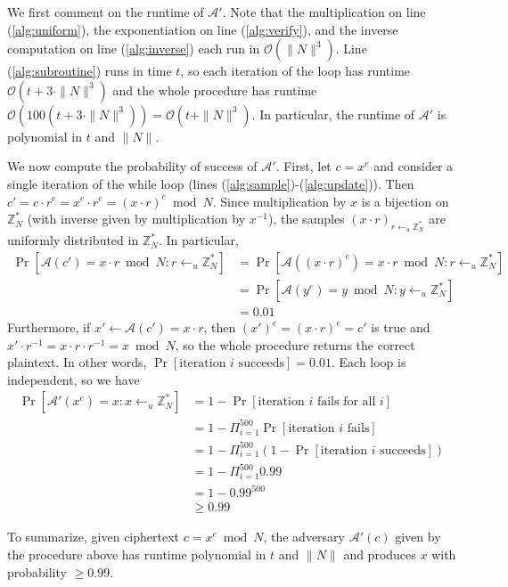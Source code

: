 \documentclass[12pt]{article}
\numberwithin{equation}{section}
\theoremstyle{plain}
\DeclareMathOperator*{\prob}{Pr}
\newcommand{\adv}{\mathcal{A}}
\newcommand{\advv}{\mathcal{A}'}
\begin{document}
We first comment on the runtime of $\advv$.
Note that the multiplication on line (\ref{alg:uniform}),
the exponentiation on line (\ref{alg:verify}),
and the inverse computation on line (\ref{alg:inverse})
each run in $\mathcal{O}(\|N\|^3)$.
Line (\ref{alg:subroutine}) runs in time $t$,
so each iteration of the loop has runtime $\mathcal{O}(t + 3 \cdot \|N\|^3)$
and the whole procedure has runtime $\mathcal{O}(100 (t + 3 \cdot \|N\|^3)) = \mathcal{O}(t + \|N\|^3)$.
In particular, the runtime of $\advv$ is polynomial in $t$ and $\| N \|$.

We now compute the probability of success of $\advv$.
First, let $c = x^e$ and consider a single iteration of the while loop (lines (\ref{alg:sample})-(\ref{alg:update})).
Then $c' = c \cdot r^e = x^e \cdot r^e = (x \cdot r)^e \bmod N$.
Since multiplication by $x$ is a bijection on $\mathbb{Z}^*_N$ (with inverse given by multiplication by $x^{-1}$),
the samples $(x \cdot r)_{r \gets_u \mathbb{Z}^*_N}$ are uniformly distributed in $\mathbb{Z}^*_N$.
In particular,
\begin{align*}
    \prob[\adv(c') = x \cdot r \bmod N : r \gets_u \mathbb{Z}^*_N]
        &= \prob[\adv((x \cdot r)^e) = x \cdot r \bmod N : r \gets_u \mathbb{Z}^*_N]\\
        &= \prob[\adv(y^e) = y \bmod N : y \gets_u \mathbb{Z}^*_N]\\
        &= 0.01
\end{align*}
Furthermore, if $x' \gets \adv(c') = x \cdot r$, then $(x')^e = (x \cdot r)^e = c'$ is true
and $x' \cdot r^{-1} = x \cdot r \cdot r^{-1} = x \bmod N$, so the whole procedure returns the correct plaintext.
In other words, $\prob[\text{iteration }i\text{ succeeds}] = 0.01$.
Each loop is independent, so we have
\begin{align*}
    \prob[\advv(x^e) = x : x \gets_u \mathbb{Z}^*_N]
        &= 1 - \prob[\text{iteration }i\text{ fails for all }i]\\
        &= 1 - \Pi_{i = 1}^{500} \prob[\text{iteration }i\text{ fails}]\\
        &= 1 - \Pi_{i = 1}^{500} (1 - \prob[\text{iteration }i\text{ succeeds}])\\
        &= 1 - \Pi_{i = 1}^{500} 0.99\\
        &= 1 - 0.99^500\\
        &\geq 0.99
\end{align*}

To summarize, given ciphertext $c = x^e \bmod N$, the adversary $\advv(c)$ given by the procedure above
has runtime polynomial in $t$ and $\|N\|$
and produces $x$ with probability $\geq 0.99$.
\end{document}
